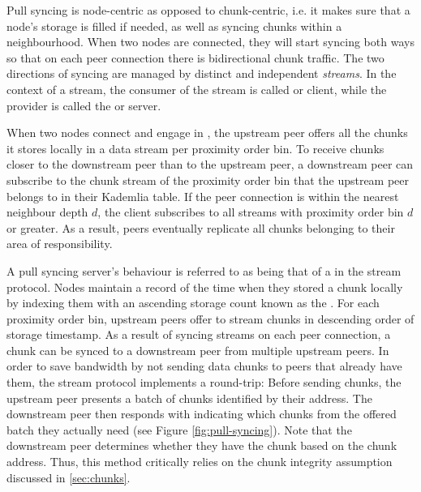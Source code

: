 Pull syncing is node-centric as opposed to chunk-centric, i.e. it makes sure that a node's storage is filled if needed, as well as syncing chunks within a neighbourhood. When two nodes are connected, they will start syncing both ways so that on each peer connection there is bidirectional chunk traffic. The two directions of syncing are managed by distinct and independent \emph{streams}. In the context of a stream, the consumer of the stream is called  or client, while the provider is called the  or server. 

When two nodes connect and engage in , the upstream peer offers all the chunks it stores locally in a data stream per proximity order bin. To receive chunks closer to the downstream peer than to the upstream peer, a downstream peer can subscribe to the chunk stream of the proximity order bin that the upstream peer belongs to in their Kademlia table. If the peer connection is within the nearest neighbour depth $d$, the client subscribes to all streams with proximity order bin $d$ or greater. As a result, peers eventually replicate all chunks belonging to their area of responsibility.

A pull syncing server's behaviour is referred to as being that of a  in the stream protocol. Nodes maintain a record of the time when they stored a chunk locally by indexing them with an ascending storage count known as the . For each proximity order bin, upstream peers offer to stream chunks in descending order of storage timestamp. As a result of syncing streams on each peer connection, a chunk can be synced to a downstream peer from multiple upstream peers. In order to save bandwidth by not sending data chunks to peers that already have them, the stream protocol implements a round-trip: Before sending chunks, the upstream peer presents a batch of chunks identified by their address. The downstream peer then responds with indicating which chunks from the offered batch they actually need (see Figure \ref{fig:pull-syncing}). Note that the downstream peer determines whether they have the chunk based on the chunk address. Thus, this method critically relies on the chunk integrity assumption discussed in \ref{sec:chunks}.


